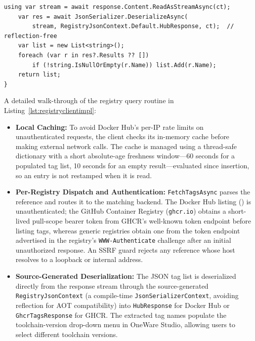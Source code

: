 \begin{lstlisting}[language=CSharp, basicstyle=\ttfamily\scriptsize, caption={Registry tag query and caching (simplified)}, label={lst:registryclientimpl}]
    using var stream = await response.Content.ReadAsStreamAsync(ct);
    var res = await JsonSerializer.DeserializeAsync(
        stream, RegistryJsonContext.Default.HubResponse, ct);  // reflection-free
    var list = new List<string>();
    foreach (var r in res?.Results ?? [])
        if (!string.IsNullOrEmpty(r.Name)) list.Add(r.Name);
    return list;
}
\end{lstlisting}

A detailed walk-through of the registry query routine in Listing~\ref{lst:registryclientimpl}:
\begin{itemize}
    \item \textbf{Local Caching:} To avoid Docker Hub's per-IP rate limits on unauthenticated requests, the client checks its in-memory cache before making external network calls. The cache is managed using a thread-safe dictionary with a short absolute-age freshness window---60 seconds for a populated tag list, 10 seconds for an empty result---evaluated since insertion, so an entry is not restamped when it is read.
    \item \textbf{Per-Registry Dispatch and Authentication:} \texttt{FetchTagsAsync} parses the reference and routes it to the matching backend. The Docker Hub listing () is unauthenticated; the GitHub Container Registry (\texttt{ghcr.io}) obtains a short-lived pull-scope bearer token from GHCR's well-known token endpoint before listing tags, whereas generic  registries obtain one from the token endpoint advertised in the registry's \texttt{WWW-Authenticate} challenge after an initial unauthorized response. An SSRF guard rejects any reference whose host resolves to a loopback or internal address.
    \item \textbf{Source-Generated Deserialization:} The JSON tag list is deserialized directly from the response stream through the source-generated \texttt{RegistryJsonContext} (a compile-time \texttt{JsonSerializerContext}, avoiding reflection for AOT compatibility) into \texttt{HubResponse} for Docker Hub or \texttt{GhcrTagsResponse} for GHCR. The extracted tag names populate the toolchain-version drop-down menu in OneWare Studio, allowing users to select different toolchain versions.
\end{itemize}

